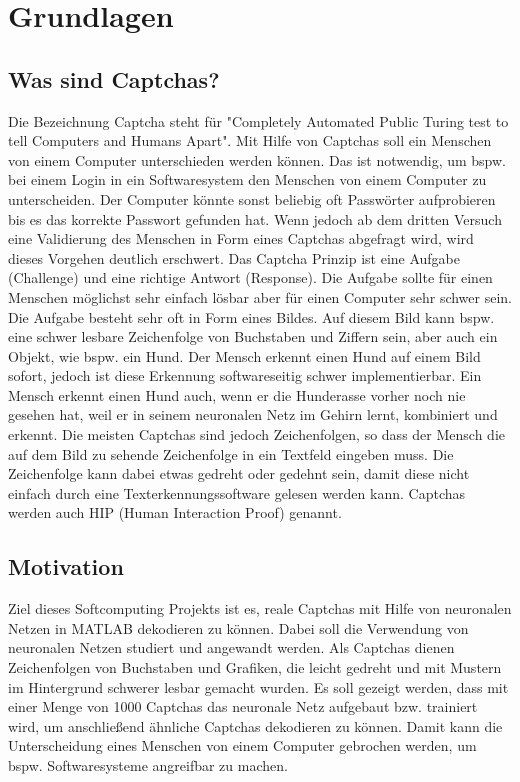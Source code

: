\section{Grundlagen}

\subsection{Was sind Captchas?}
Die Bezeichnung Captcha steht für "Completely Automated Public Turing test to tell Computers and Humans Apart". Mit Hilfe von Captchas soll ein Menschen von einem Computer unterschieden werden können. Das ist notwendig, um bspw. bei einem Login in ein Softwaresystem den Menschen von einem Computer zu unterscheiden. Der Computer könnte sonst beliebig oft Passwörter aufprobieren bis es das korrekte Passwort gefunden hat. Wenn jedoch ab dem dritten Versuch eine Validierung des Menschen in Form eines Captchas abgefragt wird, wird dieses Vorgehen deutlich erschwert. Das Captcha Prinzip ist eine Aufgabe (Challenge) und eine richtige Antwort (Response). Die Aufgabe sollte für einen Menschen möglichst sehr einfach lösbar aber für einen Computer sehr schwer sein. Die Aufgabe besteht sehr oft in Form eines Bildes. Auf diesem Bild kann bspw. eine schwer lesbare Zeichenfolge von Buchstaben und Ziffern sein, aber auch ein Objekt, wie bspw. ein Hund. Der Mensch erkennt einen Hund auf einem Bild sofort, jedoch ist diese Erkennung softwareseitig schwer implementierbar. Ein Mensch erkennt einen Hund auch, wenn er die Hunderasse vorher noch nie gesehen hat, weil er in seinem neuronalen Netz im Gehirn lernt, kombiniert und erkennt. Die meisten Captchas sind jedoch Zeichenfolgen, so dass der Mensch die auf dem Bild zu sehende Zeichenfolge in ein Textfeld eingeben muss. Die Zeichenfolge kann dabei etwas gedreht oder gedehnt sein, damit diese nicht einfach durch eine Texterkennungssoftware gelesen werden kann. Captchas werden auch HIP (Human Interaction Proof) genannt.

\subsection{Motivation}
Ziel dieses Softcomputing Projekts ist es, reale Captchas mit Hilfe von neuronalen Netzen in MATLAB dekodieren zu können. Dabei soll die Verwendung von neuronalen Netzen studiert und angewandt werden. Als Captchas dienen Zeichenfolgen von Buchstaben und Grafiken, die leicht gedreht und mit Mustern im Hintergrund schwerer lesbar gemacht wurden. Es soll gezeigt werden, dass mit einer Menge von 1000 Captchas das neuronale Netz aufgebaut bzw. trainiert wird, um anschließend ähnliche Captchas dekodieren zu können. Damit kann die Unterscheidung eines Menschen von einem Computer gebrochen werden, um bspw. Softwaresysteme angreifbar zu machen.

